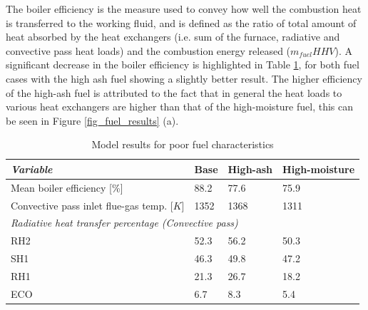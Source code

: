 \documentclass[a4paper,fleqn]{cas-sc}
\begin{document}
The boiler efficiency is the measure used to convey how well the combustion heat is transferred to the working fluid, and is defined as the ratio of total amount of heat absorbed by the heat exchangers (i.e. sum of the furnace, radiative and convective pass heat loads) and the combustion energy released ($m_{fuel}HHV$). A significant decrease in the boiler efficiency is highlighted in Table \ref{tbl_fuel_results}, for both fuel cases with the high ash fuel showing a slightly better result. The higher efficiency of the high-ash fuel is attributed to the fact that in general the heat loads to various heat exchangers are higher than that of the high-moisture fuel, this can be seen in Figure \ref{fig_fuel_results} (a). 

\begin{table}[h!]
\caption{Model results for poor fuel characteristics}\label{tbl_fuel_results}
\begin{tabular*}{\textwidth}{p{}p{}p{}p{}}
\toprule
\textit{Variable}& Base & High-ash & High-moisture \\ %
\midrule
Mean boiler efficiency [\%]& 88.2 & 77.6 & 75.9\\
Convective pass inlet flue-gas temp. [$K$]& 1352 & 1368 & 1311\\
\midrule
\multicolumn{4}{l}{\textit{Radiative heat transfer percentage (Convective pass)} }\\
\midrule
RH2 & 52.3& 56.2 & 50.3\\
SH1 & 46.3& 49.8& 47.2\\
RH1 & 21.3& 26.7& 18.2\\
ECO & 6.7& 8.3& 5.4\\
\bottomrule
\end{tabular*}
\end{table}  
\end{document}

